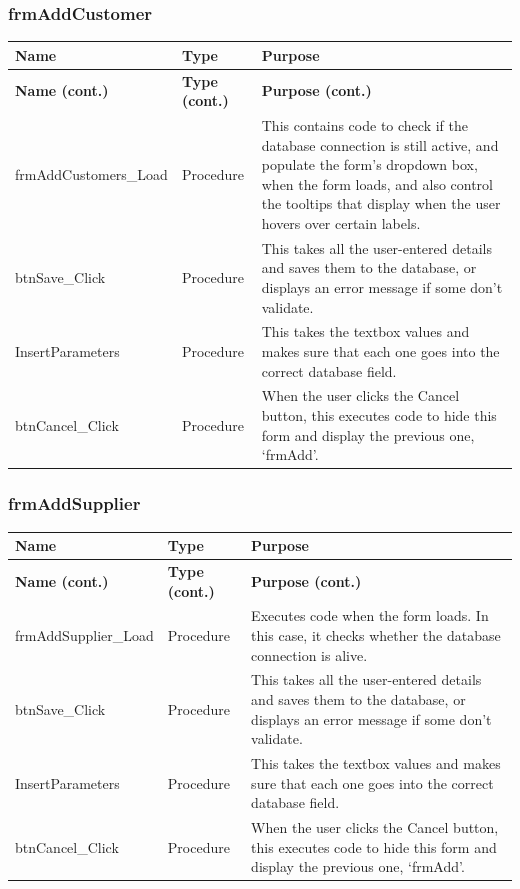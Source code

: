 	\subsubsection{frmAddCustomer}
	\begin{longtable}{ | p{4cm} | p{3cm} | p{10cm} | }
		\hline
		\textbf{Name} & \textbf{Type} & \textbf{Purpose}\\
		\endfirsthead
		\hline
		\textbf{Name (cont.)} & \textbf{Type (cont.)} & \textbf{Purpose (cont.)}\\
		\endhead
		\hline
		frmAddCustomers\_Load & Procedure & This contains code to check if the database connection is still active, and populate the form's dropdown box, when the form loads, and also control the tooltips that display when the user hovers over certain labels.\\
		\hline
		btnSave\_Click & Procedure & This takes all the user-entered details and saves them to the database, or displays an error message if some don't validate.\\
		\hline
		InsertParameters & Procedure & This takes the textbox values and makes sure that each one goes into the correct database field.\\
		\hline
		btnCancel\_Click & Procedure & When the user clicks the Cancel button, this executes code to hide this form and display the previous one, `frmAdd'.\\
		\hline
	\end{longtable}
	
	\subsubsection{frmAddSupplier}
	\begin{longtable}{ | p{4cm} | p{3cm} | p{10cm} | }
		\hline
		\textbf{Name} & \textbf{Type} & \textbf{Purpose}\\
		\endfirsthead
		\hline
		\textbf{Name (cont.)} & \textbf{Type (cont.)} & \textbf{Purpose (cont.)}\\
		\endhead
		\hline
		frmAddSupplier\_Load & Procedure & Executes code when the form loads.  In this case, it checks whether the database connection is alive.\\
		\hline
		btnSave\_Click & Procedure & This takes all the user-entered details and saves them to the database, or displays an error message if some don't validate.\\
		\hline
		InsertParameters & Procedure & This takes the textbox values and makes sure that each one goes into the correct database field.\\
		\hline
		btnCancel\_Click & Procedure & When the user clicks the Cancel button, this executes code to hide this form and display the previous one, `frmAdd'.\\
		\hline
	\end{longtable}
	
